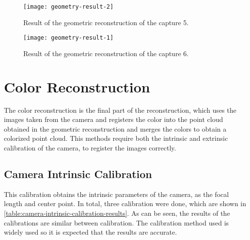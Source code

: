 \begin{figure}[h]

    \centering
    \texttt{[image: geometry-result-2]}

    \caption{Result of the geometric reconstruction of the capture 5.}
    \label{figure:results-capture-5}
    
\end{figure}

\begin{figure}[h]

    \centering
    \texttt{[image: geometry-result-1]}

    \caption{Result of the geometric reconstruction of the capture 6.}
    \label{figure:results-capture-6}
    
\end{figure}

\section{Color Reconstruction}

The color reconstruction is the final part of the reconstruction, which uses the images taken from the camera and registers the color into the point cloud obtained in the geometric reconstruction and merges the colors to obtain a colorized point cloud. This methods require both the intrinsic and extrinsic calibration of the camera, to register the images correctly. 

\subsection{Camera Intrinsic Calibration}

This calibration obtains the intrinsic parameters of the camera, as the focal length and center point. In total, three calibration were done, which are shown in \cref{table:camera-intrinsic-calibration-results}. As can be seen, the results of the calibrations are similar between calibration. The calibration method used is widely used so it is expected that the results are accurate. 

